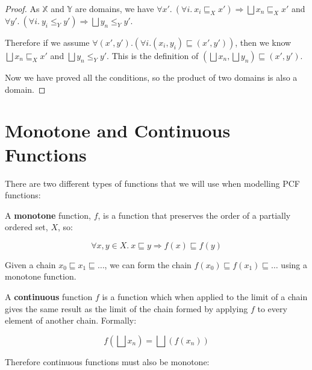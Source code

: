 \begin{proof}
As $\mathbb{X}$ and $\mathbb{Y}$ are domains, we have $\forall x'. \  (\forall i.\  x_i \sqsubseteq_X x') \Rightarrow \bigsqcup x_n \sqsubseteq_X x'$ and $\forall y'. \ (\forall i. \ y_i \leq_Y y') \Rightarrow \bigsqcup y_n \leq_Y y'$.

 Therefore if we assume $\forall (x',y'). (\forall i . (x_i,y_i) \sqsubseteq (x',y'))$, then we know $\bigsqcup x_n \sqsubseteq_X x'$ and $\bigsqcup y_n \leq_Y y'$. This is the definition of $(\bigsqcup x_n , \bigsqcup y_n) \sqsubseteq (x',y')$.

\vspace{0.25cm}

Now we have proved all the conditions, so the product of two domains is also a domain.
\end{proof}

\section{Monotone and Continuous Functions}
There are two different types of functions that we will use when modelling PCF functions:

\vspace{0.25cm}

\begin{defn}
A \textbf{monotone} function, $f$, is a function that preserves the order of a partially ordered set, $X$,  so:

\[ \forall x, y \in X. \ x \sqsubseteq y  \Rightarrow f(x) \sqsubseteq f(y) \]
\end{defn}

Given a chain $x_0 \sqsubseteq x_1 \sqsubseteq \dots$, we can form the chain $f(x_0) \sqsubseteq f(x_1) \sqsubseteq \dots$ using a monotone function.

\vspace{0.25cm}

\begin{defn}
A \textbf{continuous} function $f$ is a function which when applied to the limit of a chain gives the same result as the limit of the chain formed by applying $f$ to every element of another chain. Formally:

\[ f(\bigsqcup x_n) = \bigsqcup (f(x_n))\]
\end{defn}

Therefore continuous functions must also be monotone:

